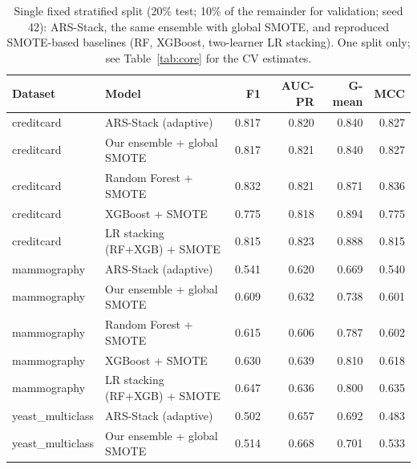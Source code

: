 \begin{table}[t]\centering\small
\caption{Single fixed stratified split (20\% test; 10\% of the remainder for validation; seed 42): ARS-Stack, the same ensemble with global SMOTE, and reproduced SMOTE-based baselines (RF, XGBoost, two-learner LR stacking). One split only; see Table~\ref{tab:core} for the CV estimates.}
\label{tab:single}
\begin{tabular}{llrrrr}
\toprule
Dataset & Model & F1 & AUC-PR & G-mean & MCC \\
\midrule
creditcard & ARS-Stack (adaptive) & 0.817 & 0.820 & 0.840 & 0.827 \\
creditcard & Our ensemble + global SMOTE & 0.817 & 0.821 & 0.840 & 0.827 \\
creditcard & Random Forest + SMOTE & 0.832 & 0.821 & 0.871 & 0.836 \\
creditcard & XGBoost + SMOTE & 0.775 & 0.818 & 0.894 & 0.775 \\
creditcard & LR stacking (RF+XGB) + SMOTE & 0.815 & 0.823 & 0.888 & 0.815 \\
\midrule
mammography & ARS-Stack (adaptive) & 0.541 & 0.620 & 0.669 & 0.540 \\
mammography & Our ensemble + global SMOTE & 0.609 & 0.632 & 0.738 & 0.601 \\
mammography & Random Forest + SMOTE & 0.615 & 0.606 & 0.787 & 0.602 \\
mammography & XGBoost + SMOTE & 0.630 & 0.639 & 0.810 & 0.618 \\
mammography & LR stacking (RF+XGB) + SMOTE & 0.647 & 0.636 & 0.800 & 0.635 \\
\midrule
yeast\_multiclass & ARS-Stack (adaptive) & 0.502 & 0.657 & 0.692 & 0.483 \\
yeast\_multiclass & Our ensemble + global SMOTE & 0.514 & 0.668 & 0.701 & 0.533 \\
\bottomrule
\end{tabular}
\end{table}